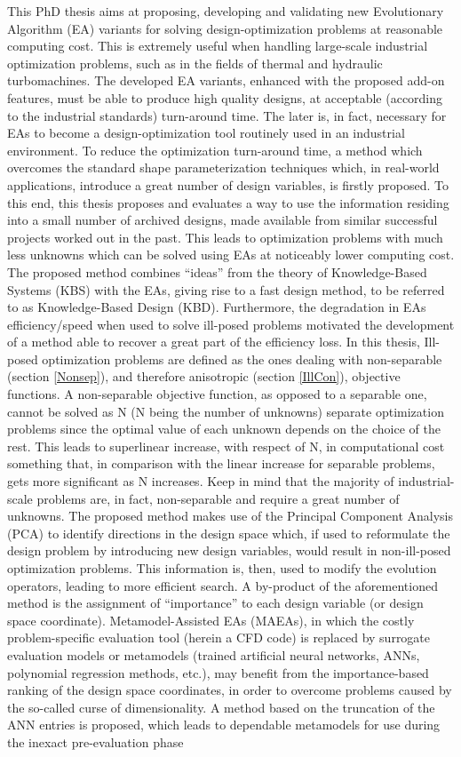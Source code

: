This PhD thesis aims at proposing, developing and validating new Evolutionary Algorithm (EA) variants for solving design-optimization problems at reasonable computing cost. This is extremely useful when handling large-scale industrial optimization problems, such as in the fields of thermal and hydraulic turbomachines. The developed EA variants, enhanced with the proposed add-on features, must be able to produce high quality designs, at acceptable (according to the industrial standards) turn-around time. The later is, in fact, necessary for EAs to become a design-optimization tool routinely used in an industrial environment. To reduce the optimization turn-around time, a method which overcomes the standard shape parameterization techniques which, in real-world applications, introduce a great number of design variables, is firstly proposed. To this end, this thesis proposes and evaluates a way to use the information residing into a small number of archived designs, made available from similar successful projects worked out in the past. This leads to optimization problems with much less unknowns which can be solved using EAs at noticeably lower computing cost. The proposed method combines ``ideas'' from the theory of Knowledge-Based Systems (KBS) with the  EAs, giving rise to a fast design method, to be referred to as Knowledge-Based Design (KBD). Furthermore, the degradation in EAs efficiency/speed when used to solve ill-posed problems motivated the development of a method able to recover a great part of the efficiency loss. In this thesis, Ill-posed optimization problems are defined as the ones dealing with non-separable (section \ref{Nonsep}), and therefore anisotropic (section \ref{IllCon}), objective functions. A non-separable objective function, as opposed to a separable one, cannot be solved as N (N being the number of unknowns) separate optimization problems since the optimal value of each unknown depends on the choice of the rest. This leads to superlinear increase, with respect of N, in computational cost something that, in comparison with the linear increase for separable problems, gets more significant as N increases. Keep in mind that the majority of industrial-scale problems are, in fact, non-separable and require a great number of unknowns.  The proposed method makes use of the Principal Component Analysis (PCA) to identify directions in the design space which, if used to reformulate the design problem by introducing new design variables, would result in  non-ill-posed optimization problems.  This information is, then, used to modify the evolution operators, leading to more efficient search.  A by-product of the aforementioned method is the assignment of ``importance'' to each design variable (or design space coordinate). Metamodel-Assisted EAs (MAEAs), in which the costly problem-specific evaluation tool (herein a CFD code) is replaced by surrogate evaluation models or metamodels (trained artificial neural networks, ANNs, polynomial regression methods, etc.), may benefit from the importance-based ranking of the design space coordinates, in order to overcome problems caused by the so-called curse of dimensionality. A method based on the truncation of the ANN entries is proposed, which leads to dependable metamodels for use during the inexact pre-evaluation phase 
